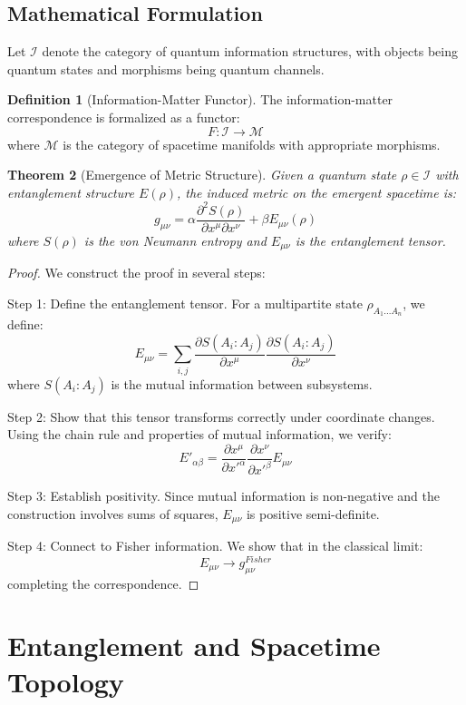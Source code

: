 \documentclass[12pt,a4paper]{article}
\theoremstyle{plain}
\newtheorem{theorem}{Theorem}[section]
\theoremstyle{definition}
\newtheorem{definition}[theorem]{Definition}
\theoremstyle{remark}
\begin{document}
\subsection{Mathematical Formulation}

Let $\mathcal{I}$ denote the category of quantum information structures, with objects being quantum states and morphisms being quantum channels.

\begin{definition}[Information-Matter Functor]
The information-matter correspondence is formalized as a functor:
\[F: \mathcal{I} \to \mathcal{M}\]
where $\mathcal{M}$ is the category of spacetime manifolds with appropriate morphisms.
\end{definition}

\begin{theorem}[Emergence of Metric Structure]
Given a quantum state $\rho \in \mathcal{I}$ with entanglement structure $E(\rho)$, the induced metric on the emergent spacetime is:
\[g_{\mu\nu} = \alpha \frac{\partial^2 S(\rho)}{\partial x^\mu \partial x^\nu} + \beta E_{\mu\nu}(\rho)\]
where $S(\rho)$ is the von Neumann entropy and $E_{\mu\nu}$ is the entanglement tensor.
\end{theorem}

\begin{proof}
We construct the proof in several steps:

Step 1: Define the entanglement tensor. For a multipartite state $\rho_{A_1...A_n}$, we define:
\[E_{\mu\nu} = \sum_{i,j} \frac{\partial S(A_i:A_j)}{\partial x^\mu}\frac{\partial S(A_i:A_j)}{\partial x^\nu}\]
where $S(A_i:A_j)$ is the mutual information between subsystems.

Step 2: Show that this tensor transforms correctly under coordinate changes. Using the chain rule and properties of mutual information, we verify:
\[E'_{\alpha\beta} = \frac{\partial x^\mu}{\partial x'^\alpha}\frac{\partial x^\nu}{\partial x'^\beta}E_{\mu\nu}\]

Step 3: Establish positivity. Since mutual information is non-negative and the construction involves sums of squares, $E_{\mu\nu}$ is positive semi-definite.

Step 4: Connect to Fisher information. We show that in the classical limit:
\[E_{\mu\nu} \to g^{Fisher}_{\mu\nu}\]
completing the correspondence.
\end{proof}

\section{Entanglement and Spacetime Topology}
\end{document}
